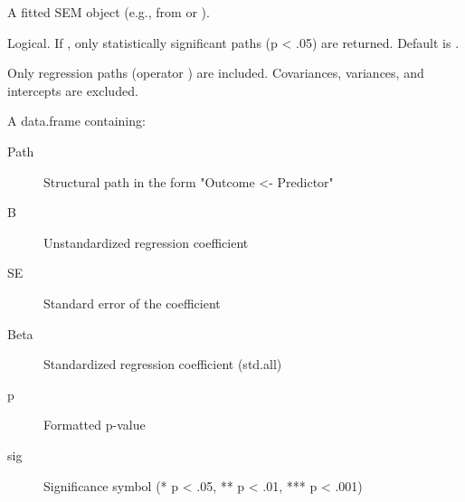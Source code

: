\documentclass[a4paper]{book}
\begin{document}
%
\begin{Arguments}
\begin{ldescription}
\item[\code{fit}] A fitted  SEM object (e.g., from  or ).

\item[\code{only\_sig}] Logical. If , only statistically significant
paths (p < .05) are returned. Default is .
\end{ldescription}
\end{Arguments}
%
\begin{Details}
Only regression paths (operator ) are included.
Covariances, variances, and intercepts are excluded.
\end{Details}
%
\begin{Value}
A data.frame containing:
\begin{description}

\item[Path] Structural path in the form "Outcome <- Predictor"
\item[B] Unstandardized regression coefficient
\item[SE] Standard error of the coefficient
\item[Beta] Standardized regression coefficient (std.all)
\item[p] Formatted p-value
\item[sig] Significance symbol (* p < .05, ** p < .01, *** p < .001)

\end{description}

\end{Value}
%
\end{document}
